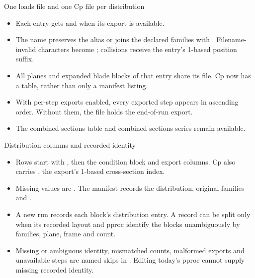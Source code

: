 \begin{frame}{One loads file and one Cp file per distribution}
\begin{itemize}\small
  \item Each  entry gets
         and
         when its export is available.
  \item The name preserves the alias or joins the declared families with
        \code{-}. Filename-invalid characters become \code{\_}; collisions
        receive the entry's 1-based position suffix.
  \item All planes and expanded blade blocks of that entry share its file.
        Cp now has a table, rather than only a manifest listing.
  \item With per-step exports enabled, every exported step appears in ascending
         order. Without them, the file holds the end-of-run export.
  \item The combined sections table and combined sections series remain available.
\end{itemize}
\end{frame}

\begin{frame}{Distribution columns and recorded identity}
\begin{itemize}\small
  \item Rows start with ,
        then the condition block and export columns. Cp also carries
        , the export's 1-based cross-section index.
  \item Missing values are . The manifest records the distribution,
        original families and .
  \item A new run records each block's distribution entry. A record can
        be split only when its recorded layout and pproc identify the blocks
        unambiguously by families, plane, frame and count.
  \item Missing or ambiguous identity, mismatched counts, malformed exports
        and unavailable steps are named skips in .
        Editing today's pproc cannot supply missing recorded identity.
\end{itemize}
\end{frame}
